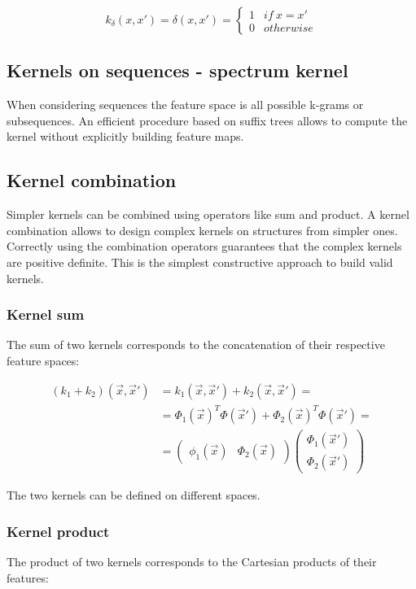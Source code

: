 		$$k_\delta(x,x') = \delta(x,x') = \begin{cases}1 &if\ x = x'\\0 &otherwise\end{cases}$$

	\subsection{Kernels on sequences - spectrum kernel}
	When considering sequences the feature space is all possible k-grams or subsequences.
	An efficient procedure based on suffix trees allows to compute the kernel without explicitly building feature maps.

	\subsection{Kernel combination}
	Simpler kernels can be combined using operators like sum and product.
	A kernel combination allows to design complex kernels on structures from simpler ones.
	Correctly using the combination operators guarantees that the complex kernels are positive definite.
	This is the simplest constructive approach to build valid kernels.

		\subsubsection{Kernel sum}
		The sum of two kernels corresponds to the concatenation of their respective feature spaces:

		\begin{align*}
			(k_1+k_2)(\vec{x},\vec{x}') &=k_1(\vec{x},\vec{x}')+k_2(\vec{x},\vec{x}')=\\
																	&=\Phi_1(\vec{x})^T\Phi(\vec{x}') + \Phi_2(\vec{x})^T\Phi(\vec{x}')=\\
																	&=\begin{pmatrix}\phi_1(\vec{x})&\Phi_2(\vec{x})\end{pmatrix}\begin{pmatrix}\Phi_1(\vec{x}')\\\Phi_2(\vec{x}')\end{pmatrix}
		\end{align*}

		The two kernels can be defined on different spaces.

		\subsubsection{Kernel product}
		The product of two kernels corresponds to the Cartesian products of their features:

